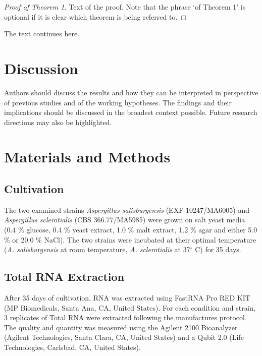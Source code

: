 \documentclass[jof,article,submit,moreauthors,pdftex,10pt,a4paper]{Definitions/mdpi}
\begin{document}
\begin{proof}[Proof of Theorem 1]
Text of the proof. Note that the phrase `of Theorem 1' is optional if it is clear which theorem is being referred to.
\end{proof}
The text continues here.

\section{Discussion}

Authors should discuss the results and how they can be interpreted in perspective of previous studies and of the working hypotheses. The findings and their implications should be discussed in the broadest context possible. Future research directions may also be highlighted.

\section{Materials and Methods}
\subsection{Cultivation}

The two examined strains \textit{Aspergillus salisburgensis} (EXF-10247/MA6005) and \textit{Aspergillus sclerotialis} (CBS 366.77/MA5985) were grown on salt yeast media (0.4 $\%$ glucose, 0.4 $\%$ yeast extract, 1.0 $\%$ malt extract, 1.2 $\%$ agar and either 5.0 $\%$ or 20.0 $\%$ NaCl). The two strains were incubated at their optimal temperature (\textit{A. salisburgensis} at room temperature,  \textit{A. sclerotialis} at  37$^{\circ}$ C) for 35 days.

\subsection{Total RNA Extraction}
After 35 days of cultivation, RNA was extracted using  FastRNA Pro RED KIT (MP Biomedicals, Santa Ana, CA, United States). For each condition and strain, 3 replicates of Total RNA were extracted following the manufactures protocol.
The quality and quantity was measured using the Agilent 2100 Bioanalyzer (Agilent Technologies, Santa Clara, CA, United States) and a Qubit 2.0 (Life Technologies, Carlsbad, CA, United States). 
\end{document}
